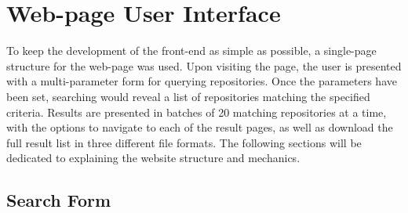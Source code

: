 \chapter{Web-page User Interface}\label{ch:5}

To keep the development of the front-end as simple as possible, a single-page structure for the web-page was used.
Upon visiting the page, the user is presented with a multi-parameter form for querying repositories.
Once the parameters have been set, searching would reveal a list of repositories matching the specified criteria.
Results are presented in batches of 20 matching repositories at a time, with the options to navigate to each of the result pages, as well as download the full result list in three different file formats.
The following sections will be dedicated to explaining the website structure and mechanics.

\section{Search Form}

